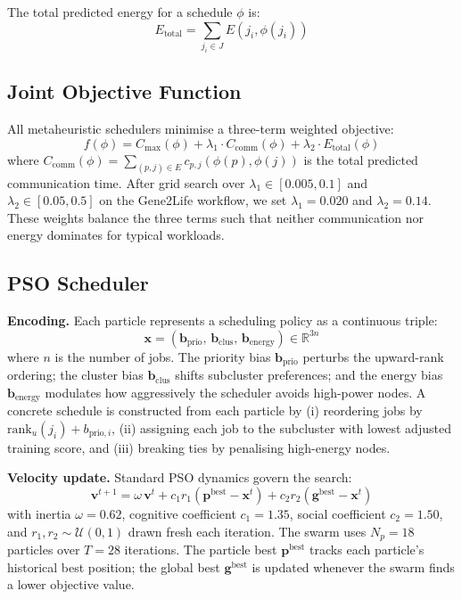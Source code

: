\documentclass[10pt,twocolumn]{article}
\begin{document}
The total predicted energy for a schedule $\phi$ is:
\begin{equation}
    E_{\text{total}} = \sum_{j_i \in J} E(j_i, \phi(j_i))
    \label{eq:energy_total}
\end{equation}

\subsection{Joint Objective Function}

All metaheuristic schedulers minimise a three-term weighted objective:
\begin{equation}
    f(\phi) = C_{\max}(\phi)
              + \lambda_1 \cdot C_{\text{comm}}(\phi)
              + \lambda_2 \cdot E_{\text{total}}(\phi)
    \label{eq:obj}
\end{equation}
where $C_{\text{comm}}(\phi) = \sum_{(p,j)\in E} c_{p,j}(\phi(p),\phi(j))$ is the
total predicted communication time. After grid search over $\lambda_1 \in [0.005,
0.1]$ and $\lambda_2 \in [0.05, 0.5]$ on the Gene2Life workflow, we set
$\lambda_1 = 0.020$ and $\lambda_2 = 0.14$. These weights balance the three terms
such that neither communication nor energy dominates for typical workloads.

\subsection{PSO Scheduler}

\textbf{Encoding.}
Each particle represents a scheduling policy as a continuous triple:
\begin{equation}
    \mathbf{x} = (\mathbf{b}_{\text{prio}},\, \mathbf{b}_{\text{clus}},\,
                  \mathbf{b}_{\text{energy}}) \in \mathbb{R}^{3n}
\end{equation}
where $n$ is the number of jobs. The priority bias $\mathbf{b}_{\text{prio}}$
perturbs the upward-rank ordering; the cluster bias $\mathbf{b}_{\text{clus}}$
shifts subcluster preferences; and the energy bias $\mathbf{b}_{\text{energy}}$
modulates how aggressively the scheduler avoids high-power nodes. A concrete
schedule is constructed from each particle by (i) reordering jobs by
$\text{rank}_u(j_i) + b_{\text{prio},i}$, (ii) assigning each job to the subcluster
with lowest adjusted training score, and (iii) breaking ties by penalising
high-energy nodes.

\textbf{Velocity update.}
Standard PSO dynamics govern the search:
\begin{equation}
    \mathbf{v}^{t+1} = \omega\,\mathbf{v}^t
                      + c_1 r_1 (\mathbf{p}^{\text{best}} - \mathbf{x}^t)
                      + c_2 r_2 (\mathbf{g}^{\text{best}} - \mathbf{x}^t)
    \label{eq:pso_vel}
\end{equation}
with inertia $\omega = 0.62$, cognitive coefficient $c_1 = 1.35$, social coefficient
$c_2 = 1.50$, and $r_1, r_2 \sim \mathcal{U}(0,1)$ drawn fresh each iteration.
The swarm uses $N_p = 18$ particles over $T = 28$ iterations. The particle best
$\mathbf{p}^{\text{best}}$ tracks each particle's historical best position; the
global best $\mathbf{g}^{\text{best}}$ is updated whenever the swarm finds a lower
objective value.
\end{document}
